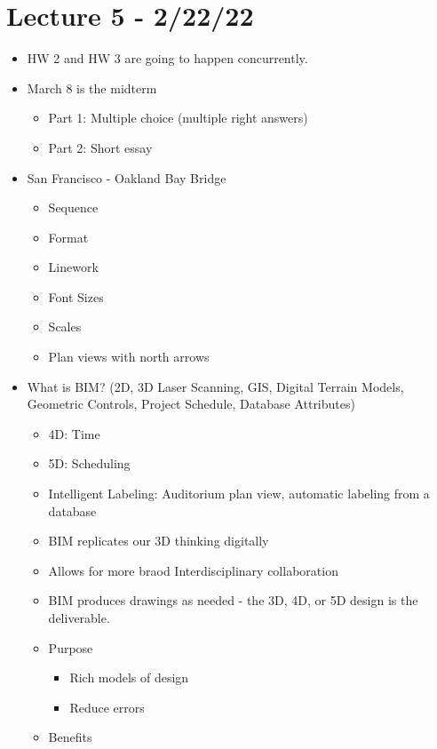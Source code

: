 \documentclass{article}
\begin{document}
\section*{Lecture 5 - 2/22/22}
\begin{itemize}
    \item HW 2 and HW 3 are going to happen concurrently.
    \item March 8 is the midterm
    \begin{itemize}
        \item Part 1: Multiple choice (multiple right answers)
        \item Part 2: Short essay
    \end{itemize}
    \item San Francisco - Oakland Bay Bridge
    \begin{itemize}
        \item Sequence
        \item Format
        \item Linework
        \item Font Sizes
        \item Scales
        \item Plan views with north arrows
    \end{itemize}
    \item What is BIM? (2D, 3D Laser Scanning, GIS, Digital Terrain Models, Geometric Controls, Project Schedule, Database Attributes)
    \begin{itemize}
        \item 4D: Time
        \item 5D: Scheduling
        \item Intelligent Labeling: Auditorium plan view, automatic labeling from a database
        \item BIM replicates our 3D thinking digitally
        \item Allows for more braod Interdisciplinary collaboration
        \item BIM produces drawings as needed - the 3D, 4D, or 5D design is the deliverable.
        \item Purpose
        \begin{itemize}
            \item Rich models of design
            \item Reduce errors
        \end{itemize}
        \item Benefits
        \begin{itemize}

\end{itemize}
\end{itemize}
\end{itemize}
\end{document}
